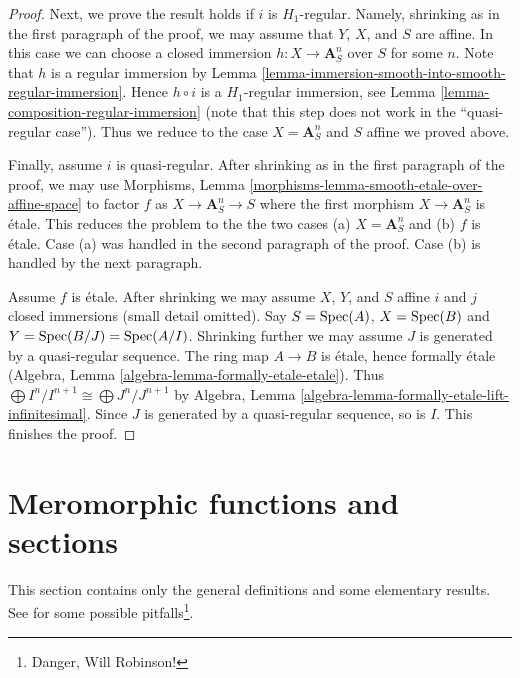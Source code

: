\begin{proof}
\medskip\noindent
Next, we prove the result holds if $i$ is $H_1$-regular.
Namely, shrinking as in the first paragraph of the proof, we may assume that
$Y$, $X$, and $S$ are affine. In this case we can choose a closed
immersion $h : X \to \mathbf{A}^n_S$ over $S$ for some $n$. Note that
$h$ is a regular immersion by
Lemma \ref{lemma-immersion-smooth-into-smooth-regular-immersion}.
Hence $h \circ i$ is a $H_1$-regular immersion, see
Lemma \ref{lemma-composition-regular-immersion} (note that this step
does not work in the ``quasi-regular case'').
Thus we reduce to the case $X = \mathbf{A}^n_S$ and $S$ affine
we proved above.

\medskip\noindent
Finally, assume $i$ is quasi-regular. After shrinking as in the first
paragraph of the proof, we may use Morphisms, Lemma
\ref{morphisms-lemma-smooth-etale-over-affine-space}
to factor $f$ as $X \to \mathbf{A}^n_S \to S$ where the first
morphism $X \to \mathbf{A}^n_S$ is \'etale. This reduces the problem
to the the two cases (a) $X = \mathbf{A}^n_S$ and (b) $f$ is \'etale.
Case (a) was handled in the second paragraph of the proof.
Case (b) is handled by the next paragraph.

\medskip\noindent
Assume $f$ is \'etale. After shrinking we may assume $X$, $Y$, and $S$
affine $i$ and $j$ closed immersions (small detail omitted).
Say $S = \mathop{\mathrm{Spec}}(A)$, $X = \mathop{\mathrm{Spec}}(B)$ and $Y = \mathop{\mathrm{Spec}}(B/J) = \mathop{\mathrm{Spec}}(A/I)$.
Shrinking further we may assume $J$ is generated by a quasi-regular sequence.
The ring map $A \to B$ is \'etale, hence formally \'etale
(Algebra, Lemma \ref{algebra-lemma-formally-etale-etale}).
Thus $\bigoplus I^n/I^{n + 1} \cong \bigoplus J^n/J^{n + 1}$
by Algebra, Lemma \ref{algebra-lemma-formally-etale-lift-infinitesimal}.
Since $J$ is generated by a quasi-regular sequence, so is $I$.
This finishes the proof.
\end{proof}











\section{Meromorphic functions and sections}
\label{section-meromorphic-functions}

\noindent
This section contains only the general definitions and some elementary results.
See \cite{misconceptions} for some possible
pitfalls\footnote{Danger, Will Robinson!}.

